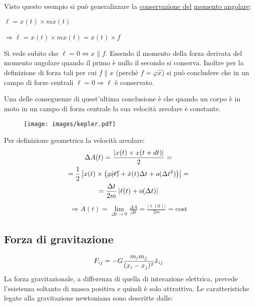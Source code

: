 \documentclass[Main.tex]{subfiles}
\begin{document}
\newpage
\noindent Visto questo esempio si può generalizzare la \underline{conservazione del} \underline{momento angolare}:
\begin{df}
	$\ell=x(t) \times m\dot x (t)$ 
	
	$\Rightarrow \boxed{\dot \ell =x(t) \times m \ddot x(t) = x(t) \times f}$
\end{df}
Si vede subito che $\dot \ell=0 \iff x \parallel f$. Essendo il momento della forza derivata del momento angolare quando il primo è nullo il secondo si conserva. Inoltre per la definizione di forza tali per cui $f \parallel x$ (perchè $f= \varphi \hat x$) si può concludere che in un campo di forze centrali $\dot \ell=0 \Rightarrow \ell$ è conservato.
\begin{osservazione}
	Una delle conseguenze di quest'ultima conclusione è che quando un corpo è in moto in un campo di forza centrale la sua velocità areolare è constante.
	
	\begin{dm}
	\vspace{-10pt}
	\begin{figure}[H]
		\center 
		\texttt{[image: images/kepler.pdf]}
	\end{figure}

 	Per definizione geometrica la velocità areolare:
 	\begin{gather}
 		\Delta A(t) = \frac{|x(t) \times x(t+dt)|}{2}=\\
 		=\frac{1}{2} \left| x(t) \times \left( \cancel{x(t)} + \dot x(t) \Delta t + o(\Delta t^2)\right)\right|=\\
 		=\frac{\Delta t}{2m} \left| \ell(t) + o(\Delta t) \right|
 	\end{gather}
 	\begin{gather}
 		\Rightarrow \dot A(t) = \lim_{\Delta t \rightarrow 0} \frac{\Delta A}{\Delta t} = \frac{| \ell(0)|}{2m} = \text{cost}
 	\end{gather}
	\end{dm}
\end{osservazione}


\subsection{Forza di gravitazione}
\begin{equation}
	F_{ij}=-G \frac{m_im_j}{(x_i-x_j)^2} \hat x_{ij} \notag
\end{equation}
La forza gravitazionale, a differenza di quella di interazione elettrica, prevede l'esistenza soltanto di massa positiva e  quindi è solo attrattiva.
Le caratteristiche legate alla gravitazione newtoniana sono descritte dalle:
\end{document}
